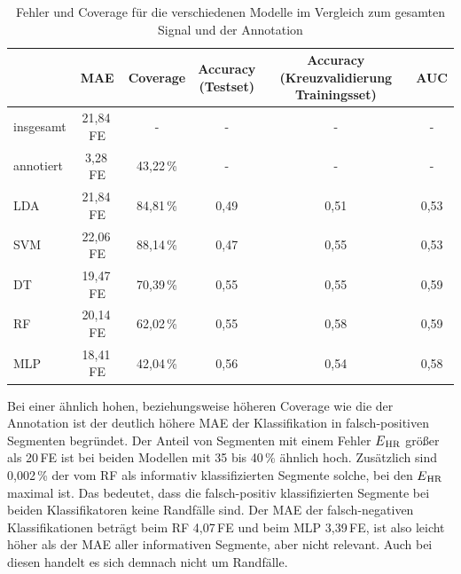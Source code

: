 \begin{table}[H]
	\centering
 	\begin{tabular}{l || c | c | c | c | c}
 					& \ac{MAE}			& Coverage		& \makecell{Accuracy\\(Testset)}	& \makecell{Accuracy\\(Kreuzvalidierung Trainingsset)}	& AUC\\ \hline
 		insgesamt 	& 21{,}84\,\si{FE}	& -				& - 									& -														& -\\
 		annotiert	& 3{,}28\,\si{FE}	& 43{,}22\,\%	& - 									& -														& -\\ \hline
 		\acs{LDA}	& 21{,}84\,\si{FE}	& 84{,}81\,\%	& 0{,}49								& 0{,}51												& 0,53\\
 		\acs{SVM}	& 22{,}06\,\si{FE}	& 88{,}14\,\%	& 0{,}47								& 0{,}55												& 0,53\\
 		\acs{DT}	& 19{,}47\,\si{FE}	& 70{,}39\,\%	& 0{,}55								& 0{,}55												& 0,59\\
 		\acs{RF}	& 20{,}14\,\si{FE}	& 62{,}02\,\%	& 0{,}55								& 0{,}58												& 0,59\\
 		\acs{MLP}	& 18{,}41\,\si{FE}	& 42{,}04\,\%	& 0{,}56								& 0{,}54												& 0,58\\
 	\end{tabular}
 	\caption[Fehler und Coverage der Klassifikation für die verschiedenen Modellen des maschinellen Lernens mit statistischen Merkmalen im Vergleich um gesamten Signal und der Annotation]{Fehler und Coverage für die verschiedenen Modelle im Vergleich zum gesamten Signal und der Annotation}
 	\label{fig:ml-statistical-MAE-Coverage}
\end{table}

Bei einer ähnlich hohen, beziehungsweise höheren Coverage wie die der Annotation ist der deutlich höhere \ac{MAE} der Klassifikation in falsch-positiven Segmenten begründet. Der Anteil von Segmenten mit einem Fehler $E\textsubscript{HR}$ größer als 20\,\si{FE} ist bei beiden Modellen mit 35 bis 40\,\% ähnlich hoch. Zusätzlich sind 0{,}002\,\% der vom \ac{RF} als informativ klassifizierten Segmente solche, bei den $E\textsubscript{HR}$ maximal ist. Das bedeutet, dass die falsch-positiv klassifizierten Segmente bei beiden Klassifikatoren keine Randfälle sind. Der \ac{MAE} der falsch-negativen Klassifikationen beträgt beim \ac{RF} 4,07\,\si{FE} und beim \ac{MLP} 3{,}39\,\si{FE}, ist also leicht höher als der \ac{MAE} aller informativen Segmente, aber nicht relevant. Auch bei diesen handelt es sich demnach nicht um Randfälle.
 	
